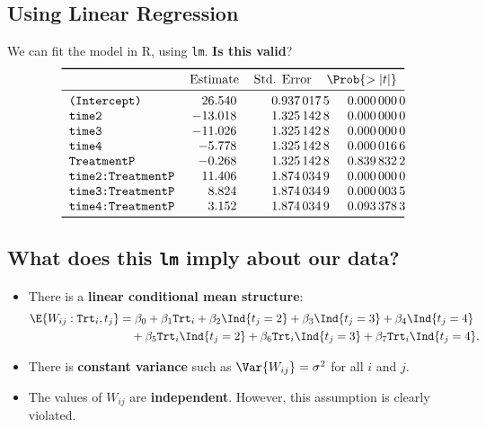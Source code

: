 \subsection*{Using Linear Regression}
We can fit the model in R, using \texttt{lm}. \textbf{Is this valid}?
\[ \begin{tabular}{l
            S[table-format=-2.3]
            S[table-format=2.3]
            S[table-format=0.3]}
        \toprule
                                  & {Estimate} & {Std. Error} & {$\Prob{>\abs{t}}$} \\
        \midrule
        \texttt{(Intercept)}      & 26.540     & 0.9370175    & 0.0000000           \\
        \texttt{time2}            & -13.018    & 1.3251428    & 0.0000000           \\
        \texttt{time3}            & -11.026    & 1.3251428    & 0.0000000           \\
        \texttt{time4}            & -5.778     & 1.3251428    & 0.0000166           \\
        \texttt{TreatmentP}       & -0.268     & 1.3251428    & 0.8398322           \\
        \texttt{time2:TreatmentP} & 11.406     & 1.8740349    & 0.0000000           \\
        \texttt{time3:TreatmentP} & 8.824      & 1.8740349    & 0.0000035           \\
        \texttt{time4:TreatmentP} & 3.152      & 1.8740349    & 0.0933783           \\
        \bottomrule
    \end{tabular} \]
\subsection*{What does this \texttt{lm} imply about our data?}
\begin{itemize}
    \item There is a \textbf{linear conditional mean structure}:
          \begin{align*}
              \E{W_{ij}\given \texttt{Trt}_i,t_j}
               & =\beta_0+\beta_1\texttt{Trt}_i+\beta_2\Ind{t_j=2}+\beta_3\Ind{t_j=3}+\beta_4\Ind{t_j=4} \\
               & \quad+\beta_5\texttt{Trt}_i\Ind{t_j=2}
              +\beta_6\texttt{Trt}_i\Ind{t_j=3}+\beta_7\texttt{Trt}_i\Ind{t_j=4}.
          \end{align*}
    \item There is \textbf{constant variance} such as $ \Var{W_{ij}}=\sigma^2 $
          for all $ i $ and $ j $.
    \item The values of $ W_{ij} $ are \textbf{independent}. However,
          this assumption is clearly violated.
\end{itemize}
